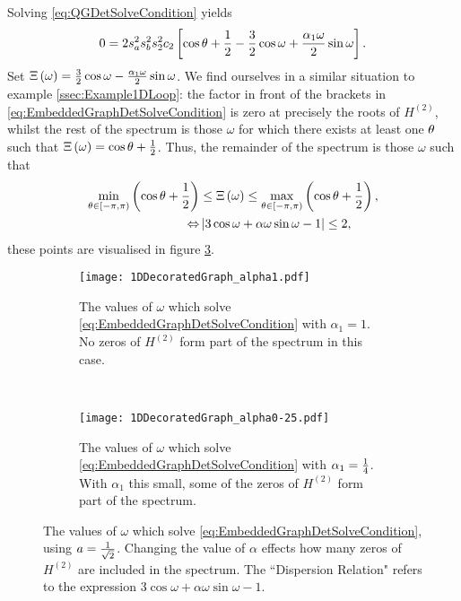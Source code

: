 Solving \eqref{eq:QGDetSolveCondition} yields
\begin{align} \label{eq:EmbeddedGraphDetSolveCondition}
	0 = 2s_a^2 s_b^2 s_2^2 c_2\left[  \cos\theta + \frac{1}{2} - \frac{3}{2}\cos\omega + \frac{\alpha_1\omega}{2}\sin\omega  \right].
\end{align}
Set $\Xi\left( \omega \right) = \frac{3}{2}\cos\omega - \frac{\alpha_1\omega}{2}\sin\omega$.
We find ourselves in a similar situation to example \ref{ssec:Example1DLoop}: the factor in front of the brackets in \eqref{eq:EmbeddedGraphDetSolveCondition} is zero at precisely the roots of $H^{(2)}$, whilst the rest of the spectrum is those $\omega$ for which there exists at least one $\theta$ such that $\Xi\left( \omega \right) = \cos\theta + \frac{1}{2}$.
Thus, the remainder of the spectrum is those $\omega$ such that
\begin{align*}
	\min_{\theta\in\left[-\pi,\pi\right)}\left( \cos\theta + \frac{1}{2} \right) &\leq \Xi\left( \omega \right) 
	\leq \max_{\theta\in\left[-\pi,\pi\right)} \left( \cos\theta + \frac{1}{2} \right), \\
	\Leftrightarrow & \left\lvert  3\cos\omega + \alpha\omega\sin\omega - 1  \right\rvert \leq 2, 
\end{align*}
these points are visualised in figure \ref{fig:1DDecoratedGraph}.
\begin{figure}[b!]
	\centering
	\begin{subfigure}[t]{0.45\textwidth}
		\centering
		\texttt{[image: 1DDecoratedGraph\_alpha1.pdf]}
		\caption{\label{fig:1DDecoratedGraph_alpha1} The values of $\omega$ which solve \eqref{eq:EmbeddedGraphDetSolveCondition} with $\alpha_1=1$. No zeros of $H^{(2)}$ form part of the spectrum in this case.}
	\end{subfigure}
	~
	\begin{subfigure}[t]{0.45\textwidth}
		\centering
		\texttt{[image: 1DDecoratedGraph\_alpha0-25.pdf]}
		\caption{\label{fig:1DDecoratedGraph_alpha0-25} The values of $\omega$ which solve \eqref{eq:EmbeddedGraphDetSolveCondition} with $\alpha_1=\frac{1}{4}$. With $\alpha_1$ this small, some of the zeros of $H^{(2)}$ form part of the spectrum.}
	\end{subfigure}
	\caption{\label{fig:1DDecoratedGraph} The values of $\omega$ which solve \eqref{eq:EmbeddedGraphDetSolveCondition}, using $a=\frac{1}{\sqrt{2}}$. Changing the value of $\alpha$ effects how many zeros of $H^{(2)}$ are included in the spectrum. The ``Dispersion Relation" refers to the expression $3\cos\omega + \alpha\omega\sin\omega - 1$.}
\end{figure}
